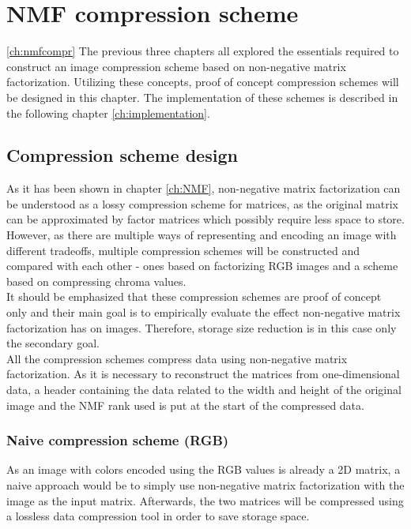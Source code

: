 \documentclass[thesis=M,english]{FITthesis}[2012/10/20]
\begin{document}


\chapter{NMF compression scheme}
\ref{ch:nmfcompr}
The previous three chapters all explored the essentials required to construct an image
compression scheme based on non-negative matrix factorization. Utilizing these concepts,
proof of concept compression schemes will be designed in this chapter. The implementation
of these schemes is described in the following chapter \ref{ch:implementation}.


\section{Compression scheme design}
As it has been shown in chapter \ref{ch:NMF}, non-negative matrix factorization
can be understood as a lossy compression scheme for matrices, as the original
matrix can be approximated by factor matrices which possibly require less
space to store. However, as there are multiple ways of representing and encoding
an image with different tradeoffs, multiple compression schemes will be constructed
and compared with each other - ones based on factorizing RGB images and a scheme based
on compressing chroma values.
\\

It should be emphasized that these compression schemes are proof of concept only
and their main goal is to empirically evaluate the effect non-negative matrix
factorization has on images. Therefore, storage size reduction is in this case only
the secondary goal.
\\

All the compression schemes compress data using non-negative matrix factorization.
As it is necessary to reconstruct the matrices from one-dimensional data, a header
containing the data related to the width and height of the original image and
the NMF rank used is put at the start of the compressed data.


\subsection{Naive compression scheme (RGB)}
As an image with colors encoded using the RGB values is already
a 2D matrix, a naive approach would be to simply use non-negative
matrix factorization with the image as the input matrix. Afterwards,
the two matrices will be compressed using a lossless data compression
tool in order to save storage space.
\\
\end{document}
